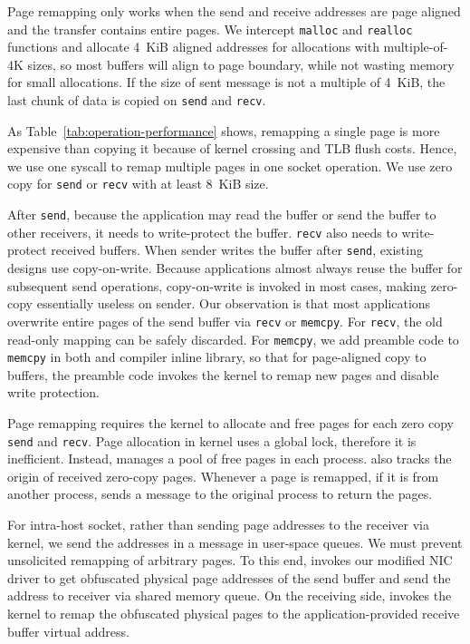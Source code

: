 Page remapping only works when the send and receive addresses are page aligned and the transfer contains entire pages.
We intercept \texttt{malloc} and \texttt{realloc} functions and allocate 4~KiB aligned addresses for allocations with multiple-of-4K sizes, so most buffers will align to page boundary, while not wasting memory for small allocations.
If the size of sent message is not a multiple of 4~KiB, the last chunk of data is copied on \texttt{send} and \texttt{recv}.

As Table~\ref{tab:operation-performance} shows, remapping a single page is more expensive than copying it because of kernel crossing and TLB flush costs. Hence, we use one syscall to remap multiple pages in one socket operation.
We use zero copy for \texttt{send} or \texttt{recv} with at least 8~KiB size.

After \texttt{send}, because the application may read the buffer or send the buffer to other receivers, it needs to write-protect the buffer.
\texttt{recv} also needs to write-protect received buffers.
When sender writes the buffer after \texttt{send}, existing designs use copy-on-write. %
Because applications almost always reuse the buffer for subsequent send operations, copy-on-write is invoked in most cases, making zero-copy essentially useless on sender.
Our observation is that most applications overwrite entire pages of the send buffer via \texttt{recv} or \texttt{memcpy}. %
For \texttt{recv}, the old read-only mapping can be safely discarded.
For \texttt{memcpy}, we add preamble code to \texttt{memcpy} in both \libipc{} and compiler inline library, so that
for page-aligned copy to \libipc{} buffers, the preamble code invokes the kernel to remap new pages and disable write protection.

Page remapping requires the kernel to allocate and free pages for each zero copy \texttt{send} and \texttt{recv}. 
Page allocation in kernel uses a global lock, therefore it is inefficient. Instead, \libipc{} manages a pool of free pages in each process.
\libipc{} also tracks the origin of received zero-copy pages.
Whenever a page is remapped, if it is from another process, \libipc{} sends a message to the original process to return the pages.

For intra-host socket, rather than sending page addresses to the receiver via kernel, we send the addresses in a message in user-space queues.
We must prevent unsolicited remapping of arbitrary pages.
To this end, \libipc{} invokes our modified NIC driver to 
get obfuscated physical page addresses of the send buffer and send the address to receiver via shared memory queue.
On the receiving side, \libipc{} invokes the kernel to remap the obfuscated physical pages to the application-provided receive buffer virtual address.


